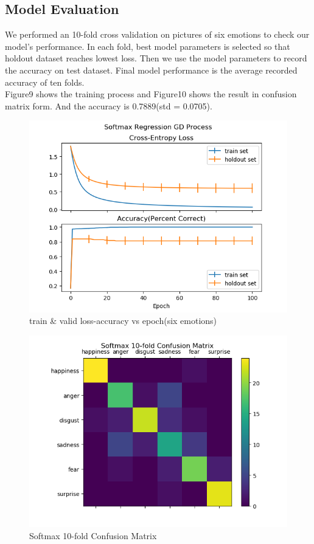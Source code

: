 \documentclass{article} %
\begin{document}
\subsection {Model Evaluation}
We performed an 10-fold cross validation on pictures of six emotions to check our model's performance. In each fold, best model parameters is selected so that holdout dataset reaches lowest loss. Then we use the model parameters to record the accuracy on test dataset. Final model performance is the average recorded accuracy of ten folds. \\
Figure9 shows the training process and Figure10 shows the result in confusion matrix form. And the accuracy is 0.7889(std = 0.0705).
\begin{figure}[h]
	\centering
	\includegraphics[scale=0.5]{./graph/softmax_tvloss_acc.png}
	\caption{train \& valid loss-accuracy vs epoch(six emotions)}
\end{figure}
\begin{figure}[h]
	\centering
	\includegraphics[scale=0.5]{./graph/confusion.png}
	\caption{Softmax 10-fold Confusion Matrix}
\end{figure} 
\end{document}

